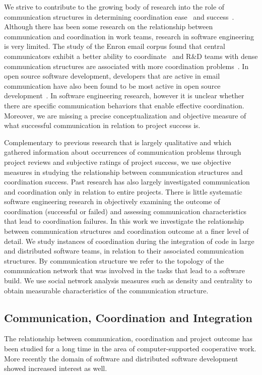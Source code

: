 We strive to contribute to the growing body of research into the role of
communication structures in determining coordination ease~\cite{hinds:cscw:2006} and
success~\cite{hossain:cscw:2006}. Although there has been some research on the
relationship between communication and coordination in work teams, research in
software engineering is very limited. The study of the Enron email corpus found
that central communicators exhibit a better ability to
coordinate~\cite{hossain:cscw:2006} and R\&D teams with dense communication
structures are associated with more coordination problems~\cite{hinds:cscw:2006}. In
open source software development, developers that are active in email
communication have also been found to be most active in open source
development~\cite{bird:msr:2006}. In software engineering research, however it is
unclear whether there are specific communication behaviors that enable effective
coordination. Moreover, we are missing a precise conceptualization and objective
measure of what successful communication in relation to project success is.

Complementary to previous research that is largely qualitative
\cite{herbsleb2003:speed,Holmstrom:2006gd} and which gathered information about
occurrences of communication problems through project reviews and subjective
ratings of project success, we use objective measures in studying the
relationship between communication structures and coordination success. Past
research has also largely investigated communication and coordination only in
relation to entire projects. There is little systematic software engineering
research in objectively examining the outcome of coordination (successful or
failed) and assessing communication characteristics that lead to coordination
failures. In this work we investigate the relationship between communication
structures and coordination outcome at a finer level of detail. We study
instances of coordination during the integration of code in large and distributed
software teams, in relation to their associated communication structures. By
communication structure we refer to the topology of the communication network
that was involved in the tasks that lead to a software build. We use social
network analysis measures such as density and centrality to obtain measurable
characteristics of the communication structure.


\subsection{Communication, Coordination and Integration}
\label{sec:RelatedCommunication}
The relationship between communication, coordination and project outcome has been
studied for a long time in the area of computer-supported cooperative work. More
recently the domain of software and distributed software development showed
increased interest as well.

